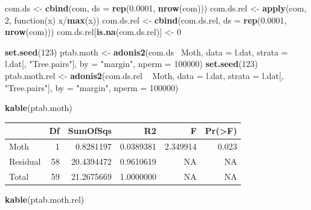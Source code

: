 \documentclass[]{article}
\newenvironment{Shaded}{\begin{snugshade}}{\end{snugshade}}
\newcommand{\KeywordTok}[1]{\textcolor[rgb]{0.13,0.29,0.53}{\textbf{{#1}}}}
\newcommand{\DataTypeTok}[1]{\textcolor[rgb]{0.13,0.29,0.53}{{#1}}}
\newcommand{\DecValTok}[1]{\textcolor[rgb]{0.00,0.00,0.81}{{#1}}}
\newcommand{\FloatTok}[1]{\textcolor[rgb]{0.00,0.00,0.81}{{#1}}}
\newcommand{\StringTok}[1]{\textcolor[rgb]{0.31,0.60,0.02}{{#1}}}
\newcommand{\NormalTok}[1]{{#1}}
\begin{document}
\begin{Shaded}
\begin{Highlighting}[]
\NormalTok{com.ds <-}\StringTok{ }\KeywordTok{cbind}\NormalTok{(com, }\DataTypeTok{ds =} \KeywordTok{rep}\NormalTok{(}\FloatTok{0.0001}\NormalTok{, }\KeywordTok{nrow}\NormalTok{(com)))}
\NormalTok{com.ds.rel <-}\StringTok{ }\KeywordTok{apply}\NormalTok{(com, }\DecValTok{2}\NormalTok{, function(x) x/}\KeywordTok{max}\NormalTok{(x))}
\NormalTok{com.ds.rel <-}\StringTok{ }\KeywordTok{cbind}\NormalTok{(com.ds.rel, }\DataTypeTok{ds =} \KeywordTok{rep}\NormalTok{(}\FloatTok{0.0001}\NormalTok{, }\KeywordTok{nrow}\NormalTok{(com)))}
\NormalTok{com.ds.rel[}\KeywordTok{is.na}\NormalTok{(com.ds.rel)] <-}\StringTok{ }\DecValTok{0}

\KeywordTok{set.seed}\NormalTok{(}\DecValTok{123}\NormalTok{)}
\NormalTok{ptab.moth <-}\StringTok{ }\KeywordTok{adonis2}\NormalTok{(com.ds~}\StringTok{ }\NormalTok{Moth, }\DataTypeTok{data =} \NormalTok{l.dat, }
                    \DataTypeTok{strata =} \NormalTok{l.dat[, }\StringTok{"Tree.pairs"}\NormalTok{], }
                    \DataTypeTok{by =} \StringTok{"margin"}\NormalTok{, }\DataTypeTok{nperm =} \DecValTok{100000}\NormalTok{)}
\KeywordTok{set.seed}\NormalTok{(}\DecValTok{123}\NormalTok{)}
\NormalTok{ptab.moth.rel <-}\StringTok{ }\KeywordTok{adonis2}\NormalTok{(com.ds.rel ~}\StringTok{ }\NormalTok{Moth, }\DataTypeTok{data =} \NormalTok{l.dat, }
                         \DataTypeTok{strata =} \NormalTok{l.dat[, }\StringTok{"Tree.pairs"}\NormalTok{], }
                         \DataTypeTok{by =} \StringTok{"margin"}\NormalTok{, }\DataTypeTok{nperm =} \DecValTok{100000}\NormalTok{)}

\KeywordTok{kable}\NormalTok{(ptab.moth)}
\end{Highlighting}
\end{Shaded}

\begin{tabular}{l|r|r|r|r|r}
\hline
  & Df & SumOfSqs & R2 & F & Pr(>F)\\
\hline
Moth & 1 & 0.8281197 & 0.0389381 & 2.349914 & 0.023\\
\hline
Residual & 58 & 20.4394472 & 0.9610619 & NA & NA\\
\hline
Total & 59 & 21.2675669 & 1.0000000 & NA & NA\\
\hline
\end{tabular}

\begin{Shaded}
\begin{Highlighting}[]
\KeywordTok{kable}\NormalTok{(ptab.moth.rel)}
\end{Highlighting}
\end{Shaded}
\end{document}
